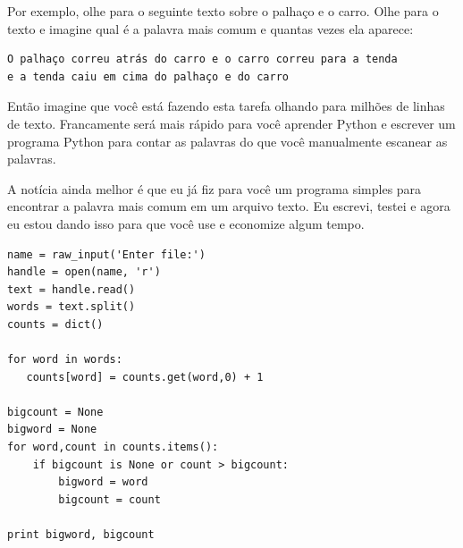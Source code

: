 Por exemplo, olhe para o seguinte texto sobre o palhaço e o carro. Olhe para o
texto e imagine qual é a palavra mais comum e quantas vezes ela aparece:
%

\beforeverb
\begin{verbatim}
O palhaço correu atrás do carro e o carro correu para a tenda
e a tenda caiu em cima do palhaço e do carro
\end{verbatim}
\afterverb

Então imagine que você está fazendo esta tarefa olhando para milhões de linhas
de texto. Francamente será mais rápido para você aprender Python e escrever um
programa Python para contar as palavras do que você manualmente escanear as
palavras.
%

A notícia ainda melhor é que eu já fiz para você um programa simples para
encontrar a palavra mais comum em um arquivo texto. Eu escrevi, testei e agora
eu estou dando isso para que você use e economize algum tempo.
%

\beforeverb
\begin{verbatim}
name = raw_input('Enter file:')
handle = open(name, 'r')
text = handle.read()
words = text.split()
counts = dict()

for word in words:
   counts[word] = counts.get(word,0) + 1

bigcount = None
bigword = None
for word,count in counts.items():
    if bigcount is None or count > bigcount:
        bigword = word
        bigcount = count

print bigword, bigcount
\end{verbatim}
\afterverb

%
%
%

